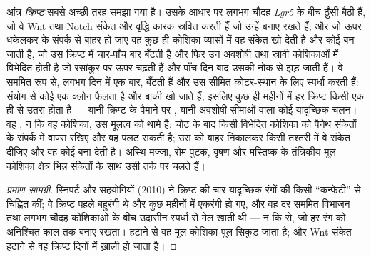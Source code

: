 \begin{proposition}[कोटर और क्रिप्ट]\label{prop:b3:stem-cells:crypt}
आंत्र \emph{क्रिप्ट} सबसे अच्छी तरह समझा गया  है। उसके आधार पर
लगभग चौदह \emph{Lgr5}   के बीच ठुँसी बैठी
हैं, जो वे Wnt तथा Notch संकेत और वृद्धि कारक स्रवित करती हैं जो उन्हें
 बनाए रखते हैं; और जो  ऊपर धकेलकर 
के संपर्क से बाहर हो जाए वह कुछ ही कोशिका-व्यासों में वह संकेत खो देती
है और कोई  बन जाती है, जो उस क्रिप्ट में चार-पाँच
बार बँटती है और फिर उन अवशोषी तथा स्रावी कोशिकाओं में विभेदित होती है जो
रसांकुर पर ऊपर चढ़ती हैं और पाँच दिन बाद उसकी नोक से झड़ जाती हैं। वे
 सममित रूप से, लगभग दिन में एक बार, बँटती हैं और उस सीमित
कोटर-स्थान के लिए स्पर्धा करती हैं: संयोग से कोई एक क्लोन फैलता है और
बाकी खो जाते हैं, इसलिए कुछ ही महीनों में हर क्रिप्ट किसी एक ही  से उतरा होता है --- यानी क्रिप्ट के पैमाने पर \emph{}, यानी अवशोषी सीमाओं वाला कोई यादृच्छिक चलन। वह , न कि वह
कोशिका, उस मूलत्व को थामे है: चोट के बाद किसी विभेदित कोशिका को पैनेथ
संकेतों के संपर्क में वापस रखिए और वह पलट सकती है; उस  को
बाहर निकालकर किसी तश्तरी में वे संकेत दीजिए और वह कोई  बना
देती है। अस्थि-मज्जा, रोम-पुटक, वृषण और मस्तिष्क के तंत्रिकीय मूल-कोशिका
क्षेत्र भिन्न संकेतों के साथ उसी तर्क पर चलते हैं।
\end{proposition}
\begin{proof}[प्रमाण-सामग्री]
स्निपर्ट और सहयोगियों (2010) ने क्रिप्ट की  चार यादृच्छिक
रंगों की किसी ``कन्फ़ेटी'' से चिह्नित कीं; वे क्रिप्ट पहले बहुरंगी थे और
कुछ महीनों में एकरंगी हो गए, और वह दर सममित विभाजन तथा लगभग चौदह
कोशिकाओं के बीच उदासीन स्पर्धा से मेल खाती थी --- न कि 
से, जो हर रंग को अनिश्चित काल तक बनाए रखता।  हटाने से वह
मूल-कोशिका पूल सिकुड़ जाता है; और Wnt संकेत हटाने से वह क्रिप्ट दिनों
में ख़ाली हो जाता है।
\end{proof}


